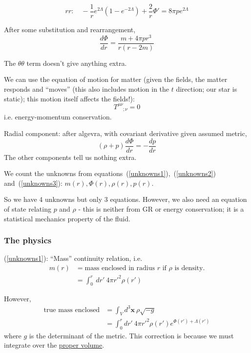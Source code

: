 \documentclass[a4paper]{article} %
\newcommand{\vect}[1]{\mathbf{#1}} %
\newcommand{\ph}[1]{\phantom{#1}}
\begin{document}
\begin{equation}
rr:\quad -\frac{1}{r}e^{2\Lambda}(1-e^{-2\Lambda})+\frac{2}{r}\Phi'=8\pi p e^{2\Lambda}
\end{equation}

After some substitution and rearrangement,
\begin{equation}
\frac{d\Phi}{dr}=\frac{m+4\pi p r^3}{r(r-2m)}\label{unknowns2}
\end{equation}

The $\theta\theta$ term doesn't give anything extra.

We can use the equation of motion for matter (given the fields, the matter responds and ``moves'' (this also includes motion in the $t$ direction; our star is static); this motion itself affects the fields!):
\begin{equation}
T^{\mu\nu}_{\ph{\mu\nu};\nu}=0
\end{equation}
i.e. energy-momentum conservation.

Radial component: after algevra, with covariant derivative given assumed metric,
\begin{equation}
(\rho+p)\frac{d\Phi}{dr}=-\frac{dp}{dr}\label{unknowns3}
\end{equation}
The other components tell us nothing extra.

We count the unknowns from equations~(\ref{unknowns1}),~(\ref{unknowns2}) and~(\ref{unknowns3}): $m(r),\Phi(r),\rho(r),p(r)$.

So we have 4 unknowns but only 3 equations. However, we also need an equation of state relating $p$ and $\rho$ - this is neither from GR or energy conservation; it is a statistical mechanics property of the fluid.

\subsubsection{The physics}

(\ref{unknowns1}): ``Mass'' continuity relation, i.e. 
\begin{align}
m(r)&=\text{mass enclosed in radius $r$ if $\rho$ is density.}\\
&=\int^r_0~dr'~4\pi r'^2\rho(r')
\end{align}

However,  
\begin{align}
\text{true mass enclosed} &=\int_V d^3\vect{x}~\rho\sqrt{-g}\\
&=\int^r_0 dr'~4\pi r'^2 \rho(r') e^{\Phi(r')+\Lambda(r')} 
\end{align}
where $g$ is the determinant of the metric. This correction is because we must integrate over the \underline{proper volume}.
\end{document}
